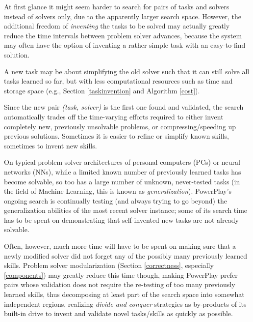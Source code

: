 \documentclass{article}
\begin{document}
At first glance it might seem harder to search for pairs of tasks and solvers instead of solvers only,
due to the apparently larger search space. However, the additional freedom of {\em inventing} the
tasks to be solved may actually greatly reduce the time 
intervals between problem solver advances, because the system may often have the option
of inventing a rather simple task with an easy-to-find solution.

A new task may be about simplifying the old solver such that it can still solve all tasks learned so far,
but with less computational resources such as time and storage space (e.g., 
Section \ref{taskinvention} and Algorithm \ref{cost}).

Since the new pair {\em (task, solver)} is the first one found 
and validated, the search automatically trades off the time-varying efforts required 
to either invent completely new, previously unsolvable problems, 
or compressing/speeding up previous solutions. 
Sometimes it is easier to refine or simplify known skills, sometimes to invent new skills.


On typical problem solver architectures of personal computers (PCs) or neural networks (NNs), 
while a limited known number of previously learned tasks has become solvable,
so too has a large number of unknown, never-tested tasks (in the field of Machine Learning, this is known as {\em generalization}). 
 {\sc PowerPlay}'s ongoing search is continually testing (and always trying to go beyond) 
the generalization abilities of the most recent solver instance;
some of its search time has to be spent on demonstrating that  self-invented new tasks
are not  already solvable.


Often, however, much more  time will have to be spent on making sure that a newly modified solver
did not forget any of the possibly many previously learned skills.
Problem solver modularization (Section \ref{correctness}, especially \ref{components}) 
may greatly reduce this time though, making 
 {\sc PowerPlay} prefer pairs whose validation does not require the re-testing of
too many previously learned skills, thus decomposing at least part of the search space into 
somewhat independent regions, realizing {\em divide and conquer} strategies as by-products of 
its built-in drive to invent and validate novel tasks/skills as quickly as possible.

\end{document}
